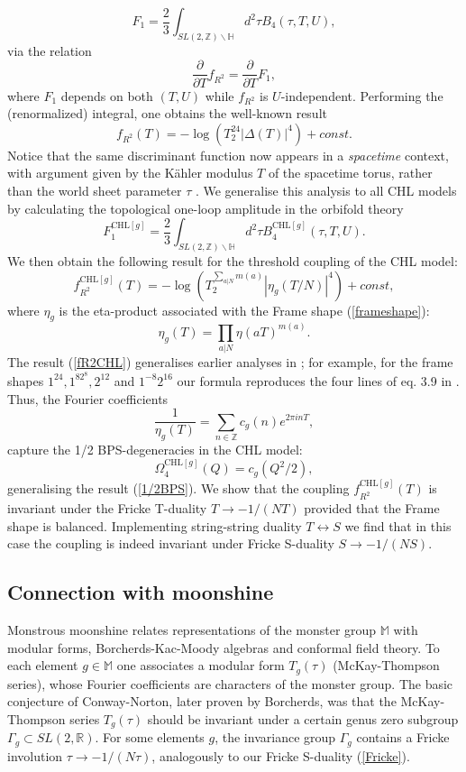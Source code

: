 \documentclass[a4paper,11pt]{article}
\numberwithin{equation}{section}
\def\be{\begin{equation}}
\def\ee{\end{equation}}
\begin{document}
\be
F_1=\frac{2}{3} \int_{SL(2, \mathbb{Z})\backslash \mathbb{H}}d^2\tau B_4(\tau, T, U),
\ee
via the relation 
\be
\frac{\partial}{\partial T} f_{R^2}=\frac{\partial}{\partial T}  F_1, 
\ee
where $F_1$ depends on both $(T,U)$ while $f_{R^2}$ is $U$-independent. Performing the (renormalized) integral, one obtains the well-known result \cite{Harvey:1996ir}
\be
f_{R^2}(T)=-\log(T_2^{24}|\Delta(T)|^{4})+const.
\ee
Notice that the same discriminant function now appears in a \emph{spacetime} context, with argument given by the K\"ahler modulus $T$ of the spacetime torus, rather than the 
world sheet parameter $\tau$ \cite{Ooguri:2004zv,Dabholkar:2004yr,Dabholkar:2005by,Dabholkar:2005dt}. We generalise this analysis to all CHL models by calculating the topological one-loop amplitude in the orbifold theory
\be
F^{\text{CHL}[g]}_{1} =\frac{2}{3} \int_{SL(2,\mathbb{Z})\backslash \mathbb{H}}d^2\tau B^{\text{CHL}[g]}_4(\tau, T, U).
\ee
We then obtain the following result for the threshold coupling of the CHL model:
\be
f^{\text{CHL}[g]}_{R^2}(T)=-\log(T_2^{\sum_{a|N} m(a)}|\eta_g(T/N)|^4)+const,
\label{fR2CHL}
\ee
where $\eta_g$ is the eta-product associated with the Frame shape (\ref{frameshape}):
\be
\eta_g(T)=\prod_{a|N}\eta(aT)^{m(a)}.
\ee
The result (\ref{fR2CHL}) generalises earlier analyses in \cite{Antoniadis:1995zn,Dabholkar:2005dt}; for example, for the frame shapes $1^{24}, 1^82^8, 2^{12}$ and $1^{-8}2^{16}$ our formula reproduces the four lines of eq. 3.9 in \cite{Dabholkar:2005dt}. Thus, the Fourier coefficients 
\be
\frac{1}{\eta_g(T)}=\sum_{n\in \mathbb{Z}}c_g(n) e^{2\pi i n T},
\ee
 capture the 1/2 BPS-degeneracies in the CHL model:
\be
\Omega_4^{\text{CHL}[g]}(Q)=c_g(Q^2/2),
\ee
generalising the result (\ref{1/2BPS}). We show that the coupling $f^{\text{CHL}[g]}_{R^2}(T)$ is invariant under the Fricke T-duality $T\to -1/(NT)$ provided that the Frame shape is balanced. Implementing string-string duality $T\leftrightarrow S$ we find that in this case the coupling is indeed invariant under Fricke S-duality $S\to -1/(NS)$.

\subsection{Connection with  moonshine}
Monstrous moonshine relates representations of the monster group $\mathbb{M}$ with modular forms, Borcherds-Kac-Moody algebras and conformal field theory. To each element $g\in \mathbb{M}$  one associates a modular form $T_g(\tau)$ (McKay-Thompson series), whose Fourier coefficients are characters of the monster group. The basic conjecture of Conway-Norton, later proven by Borcherds, was that the McKay-Thompson series $T_g(\tau)$ should be invariant under a certain genus zero subgroup $\Gamma_g\subset SL(2,\mathbb{R})$. For some elements $g$, the invariance group $\Gamma_g$ contains a Fricke involution $\tau \to -1/(N\tau)$, analogously to our Fricke S-duality (\ref{Fricke}).
\end{document}
